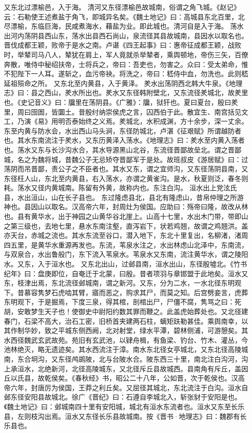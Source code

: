 \documentclass[12pt,UTF8]{ctexbook}
\begin{document}
又东北过漂榆邑，入于海。
清河又东径漂榆邑故城南，俗谓之角飞城。《赵记》云：石勒使王述煮盐于角飞，即城异名矣。《魏土地记》曰：高城县东北百里，北尽漂榆，东临巨海，民咸煮海水，藉盐为业。即此城也。清河自是入于海。
荡水出河内荡阴县西山东，荡水出县西石尚山，泉流径其县故城南，县因水以取名也。晋伐成都王颖，败帝于是水之南。卢谌《四王起事》曰：惠帝征成都王颖，战败时，举辇司马八人，辇犹在肩上，军人竟就杀举辇者，乘舆顿地，帝伤三矢，百僚奔散，唯侍中秘绍扶帝，士将兵之，帝曰：吾吏也，勿害之。众曰：受太弟命，惟不犯陛下一人耳。遂斩之，血污帝袂。将洗之，帝曰：嵇侍中血，勿洗也。此则嵇延祖殒命之所。
又东北至内黄县，入于黄泽。
羑水出荡阴西北韩大牛泉。《地理志》曰：县之西山，羑水所出也。羑水又东径韩附壁北，又东流径羑城北，故羑里也。《史记音义》曰：牖里在荡阴县。《广雅》：牖，狱犴也。夏曰夏台，殷曰羑里，周曰囹圄，皆圜土。昔殷纣纳崇侯虎之言，囚西伯于此。散宜生、南宫括见文工，乃演《易》用明否泰始终之义焉。羑城北，水积成渊，方十余步，深一丈余。东至内黄与防水会，水出西山马头涧，东径防城北，卢湛《征艰赋》所谓越防者也。其水东南流注于羑水，又东历黄泽入荡水。《地理志》曰：羑水至内黄入荡者也。荡水又东与长沙沟水合，其水导源黑山北谷，东流径晋鄙故垒北。谓之晋鄙城，名之为魏将城，昔魏公子无忌矫夺晋鄙军于是处。故班叔皮《游居赋》曰：过荡阴而吊晋鄙，责公子之不臣者也。其水又东，谓之宜师沟，又东径荡阴县南，又东径枉人山，东北至内黄县，右入荡水，亦谓之黄雀沟。是水，秋夏则泛，春冬则耗。荡水又径内黄城南。陈留有外黄，故称内也。东注白沟。
洹水出上党泫氏县，水出洹山，山在长子县也。
东过隆虑县北，县北有隆虑山，昔帛仲理之所游神也。县因山以取名。汉高帝六年，封周灶为侯国。应助曰：殇帝曰隆，故改从林也。县有黄华水，出于神园之山黄华谷北崖上。山高十七里，水出木门带，带即山之第三级也，去地七里，悬水东南注壑，直泻岩下，状若鸡翘，故谓之鸡翘洪。盖亦天台，赤城之流也。其水东流至谷口，潜入地下，东北十里复出，名柳渚，渚周四五里，是黄华水重源再发也。东流，苇泉水注之，水出林虑山北泽中，东南流，与双泉合，水出鲁般门，东下流入苇泉水。苇泉水又东南，流注黄华水，谓之陵阳水。又东，入于洹水也。
又东北出山，过邺县南，洹水出山，东径殷墟北。《竹书纪年》曰：盘庚即位，自奄迁于北蒙，曰殷。昔者项羽与章邯盟于此地矣。洹水又东，枝津出焉，东北流径邺城南，谓之新河。又东，分为二水，一水北径东明观下。昔慕容隽梦石虎啮其臂，寤而恶之，购求其尸，而莫之知。后宫劈妾言，虎葬东明观下，于是掘焉，下度三泉，得其棺，剖棺出尸，尸僵不腐，隽骂之曰：死胡，安敢梦生天子也！使御史中尉阳约数其罪而鞭之。此盖虎始葬处也。又北径建春门，石梁不高大，治石工密，旧桥首夹建两石柱，螭矩趺勒甚佳。乘舆南幸，以其作制华妙，致之平城东侧西阙，北对射堂，绿水平潭，碧林侧浦，可游憩矣。其水西径魏武玄武故苑。苑旧有玄武池，以肄舟楫，有鱼梁、钓台、竹木、灌丛，今池林绝灭，略无遗迹矣。其水西流注于漳。南水东北径女亭城北，又东北径高陵城南，东合坰沟，又东径鸬鹚陂，北与台陂水合。陂东西三十里，南北注白沟河，沟上承洹水，北绝新河，北径高陵城东，又北径斥丘县故城西。县南角有斥丘，盖因丘以氏县，故乾侯矣。《春秋经》书，昭公二十八年，公如晋，次于乾侯也。汉高帝六年，封唐厉为侯国，王莽之利丘矣。又屈径其城北，东北流注于白沟。洹水自邺东径安阳县故城北。徐广《晋纪》曰：石遵自李城北入，斩张豺于安阳是也。《魏土地记》曰：邺城南四十里有安阳城，城北有洹水东流者也。洹水又东至长乐县，左则枝沟出焉。洹水又东径长乐县故城南。按《晋书·地理志》曰：魏郡有长乐县也。
\end{document}
